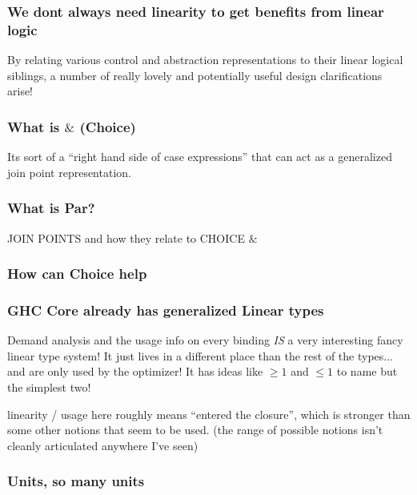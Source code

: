 \documentclass[11pt,reqno]{beamer}
\begin{document}
\begin{frame}\frametitle{We dont always need linearity to get benefits from linear logic}
By relating various control and abstraction representations to their linear logical
siblings, a number of really lovely and potentially useful design clarifications
arise!


\end{frame}

\begin{frame}\frametitle{What is \( \& \) (Choice)}
Its sort of a ``right hand side of case expressions'' that can act as a generalized
join point representation.



\end{frame}


\begin{frame}\frametitle{What is Par?}


\end{frame}

\begin{frame}
  JOIN POINTS and how they relate to CHOICE \( \&  \)
\end{frame}

\begin{frame}\frametitle{How can Choice help }



\end{frame}


\begin{frame}\frametitle{GHC Core already has generalized Linear types}

Demand analysis and the usage info on every binding \emph{IS} a very interesting
fancy linear type system! It just lives in a different place than the rest of the
types... and are only used by the optimizer! It has ideas like \( \geq1 \) and \( \leq 1 \)
to name but the simplest two!

linearity / usage here roughly means ``entered the closure'', which is stronger
than some other notions that seem to be used.
(the range of possible notions isn't cleanly articulated anywhere I've seen)

\end{frame}


\begin{frame}\frametitle{Units, so many units}



\end{frame}
\end{document}
